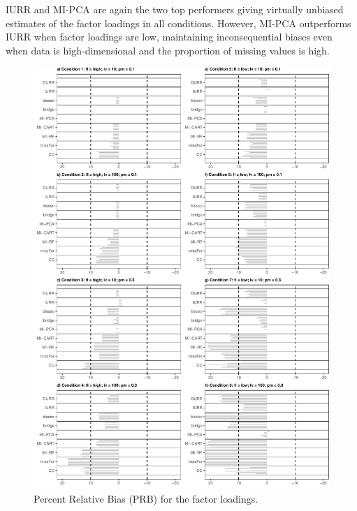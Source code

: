 	IURR and MI-PCA are again the two top performers giving virtually unbiased estimates
	of the factor loadings in all conditions. 
	However, MI-PCA outperforms IURR when factor loadings are low, maintaining inconsequential 
	biases even when data is high-dimensional and the proportion of missing values is high.

\begin{figure}
	\includegraphics[width=\textwidth]{../../output/graphs/exp2_CFA_lambda_BPR.pdf}
\caption{Percent Relative Bias (PRB) for the factor loadings.}
\label{fig:exp2fl}
\end{figure}

\FloatBarrier %

